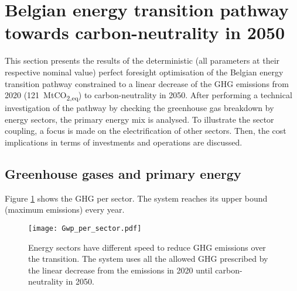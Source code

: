 \section{Belgian energy transition pathway towards carbon-neutrality in 2050} 
\label{app:bel_PF_TD}
This section presents the results of the deterministic (\ie all parameters at their respective nominal value) perfect foresight optimisation of the Belgian energy transition pathway constrained to a linear decrease of the \gls{GHG} emissions from 2020 (121~MtCO\textsubscript{2,eq}) to carbon-neutrality in 2050.  After performing a technical investigation of the pathway by checking the greenhouse gas breakdown by energy sectors, the primary energy mix is analysed. To illustrate the sector coupling, a focus is made on the electrification of other sectors. Then, the cost implications in terms of investments and operations are discussed.

\subsection{Greenhouse gases and primary energy}
Figure \ref{fig:pestd_ghg} shows the \acrfull{GHG} per sector. 
The system reaches its upper bound (\ie maximum emissions) every year. 

 \begin{figure}[!htbp]
\centering
\texttt{[image: Gwp\_per\_sector.pdf]}
\caption{Energy sectors have different speed to reduce \gls{GHG} emissions over the transition. The system uses all the allowed \gls{GHG} prescribed by the linear decrease from the emissions in 2020 until carbon-neutrality in 2050.}
\label{fig:pestd_ghg}
\end{figure}

